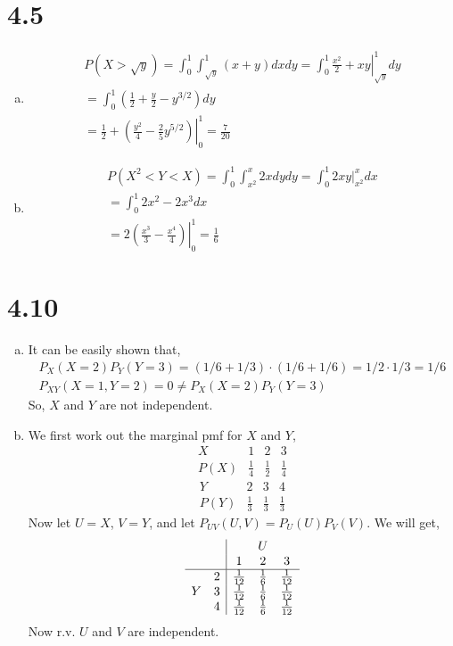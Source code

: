 \documentclass[letterpaper]{article}
\begin{document}
    \section*{4.5}
    \begin{enumerate}[(a)]
    \item
    \begin{eqnarray*}
        P(X > \sqrt{y}) = \int_0^1 \int_{\sqrt y}^1 (x+y) dx dy = \int_0^1 \left. \frac{x^2}{2} + xy \right|^1_{\sqrt y} dy\\
        = \int_0^1 (\frac{1}{2} + \frac{y}{2} - y^{3/2}) dy \\
        = \frac{1}{2} + \left. \left(\frac{y^2}{4} - \frac{2}{5} y^{5/2} \right) \right|^1_0 = \frac{7}{20}
    \end{eqnarray*}
    \item
    \begin{eqnarray*}
        P(X^2 < Y < X) = \int_0^1 \int_{x^2}^x 2x dy dy = \int_0^1 \left. 2xy \right|^x_{x^2} dx\\
        = \int_0^1 2x^2 - 2x^3 dx \\
        = \left. 2 \left(\frac{x^3}{3} - \frac{x^4}{4} \right) \right|^1_0 = \frac{1}{6}
    \end{eqnarray*}
    \end{enumerate}
    \section*{4.10}
    \begin{enumerate}[(a)]
    \item
    It can be easily shown that,
    \begin{eqnarray*}
    P_X(X=2)P_Y(Y=3) = (1/6 + 1/3) \cdot (1/6 + 1/6) = 1/2 \cdot 1/3 = 1/6\\
    P_{XY}(X=1, Y=2) = 0 \neq P_X(X=2) P_Y(Y=3)
    \end{eqnarray*}
    So, $X$ and $Y$ are not independent.
    \item
    We first work out the marginal pmf for $X$ and $Y$, 
    \[
    \begin{array}{c|ccc}
    X & 1 & 2 & 3\\
    \hline
    P(X) & \frac{1}{4} & \frac{1}{2} & \frac{1}{4}
    \end{array}
    \]
    \[
    \begin{array}{c|ccc}
    Y & 2 & 3 & 4\\
    \hline
    P(Y) & \frac{1}{3} & \frac{1}{3} & \frac{1}{3}
    \end{array}
    \]
    Now let $U=X$, $V=Y$, and let $P_{UV}(U, V) = P_U(U) P_V(V)$. We will get,
    \[
    \begin{array}{cc|ccc}
    & & & U & \\
    & & 1 & 2 & 3 \\
    \hline
    & 2 & \frac{1}{12} & \frac{1}{6} & \frac{1}{12} \\
    Y & 3 & \frac{1}{12} & \frac{1}{6} & \frac{1}{12} \\
    & 4 & \frac{1}{12} & \frac{1}{6} & \frac{1}{12} \\
    \end{array}
    \]
    Now r.v. $U$ and $V$ are independent.
    \end{enumerate}
\end{document}
